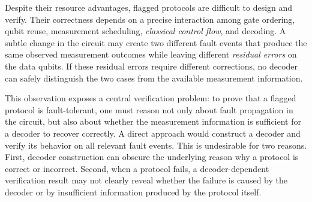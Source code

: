 \documentclass[acmsmall,screen,review,anonymous,nonacm]{acmart}
\newcommand{\showcomment}[1]{#1}
\newcommand{\bw}[1]{\showcomment{\textcolor{green}{\textbf{BW:} #1}}}
\begin{document}

Despite their resource advantages, flagged protocols are difficult to design and verify. Their correctness depends on a precise interaction among gate ordering, qubit reuse, measurement scheduling, \emph{classical control flow}, and decoding. A subtle change in the circuit may create two different fault events that produce the same observed measurement outcomes while leaving different \emph{residual errors} on the data qubits. If these residual errors require different corrections, no decoder can safely distinguish the two cases from the available measurement information.



This observation exposes a central verification problem: to prove that a flagged protocol is fault-tolerant, one must reason not only about fault propagation in the circuit, but also about whether the measurement information is sufficient for a decoder to recover correctly. A direct approach would construct a decoder and verify its behavior on all relevant fault events. This is undesirable for two reasons. First, decoder construction can obscure the underlying reason why a protocol is correct or incorrect. Second, when a protocol fails, a decoder-dependent verification result may not clearly reveal whether the failure is caused by the decoder or by insufficient information produced by the protocol itself.
\end{document}

